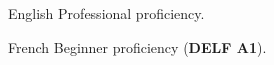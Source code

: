 
\begin{cvskills}

  \cvskill
    {English} %
    {Professional proficiency.} %

  \cvskill
    {French } %
    {Beginner proficiency ({\bf DELF A1}).} %
\end{cvskills}
